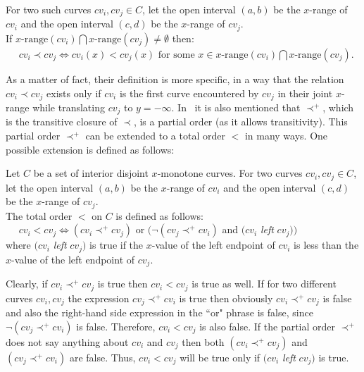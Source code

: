 \begin{definition}
For two such curves $cv_i, cv_j \in C$,
let the open interval $(a,b)$ be the $x$-range of $cv_i$
and the open interval $(c,d)$ be the $x$-range of $cv_j$.\\
If $x\text{-range}(cv_i) \bigcap x\text{-range}(cv_j) \neq\emptyset$ then:\\
\mbox{\ \ } $cv_i \prec cv_j \Leftrightarrow
 cv_i(x) < cv_j(x) \text{ for some } x \in x\text{-range}(cv_i) \bigcap x\text{-range}(cv_j)$.
\end{definition}

As a matter of fact, their definition is more specific,
in a way that the relation $cv_i \prec cv_j$ exists only
if $cv_i$ is the first curve encountered by $cv_j$
in their joint $x$-range
while translating $cv_j$ to $y=-\infty$.
In~\cite{GY-TSR-80} it is also mentioned that $\prec^+$, which is the transitive closure
of $\prec$, is a partial order (as it allows transitivity).
This partial order $\prec^+$ can be extended to a total order $<$ in many ways.
One possible extension is defined as follows:

\begin{definition}
\label{def:ord}
Let $C$ be a set of interior disjoint $x$-monotone curves.
For two curves $cv_i, cv_j \in C$,
let the open interval $(a,b)$ be the $x$-range of $cv_i$
and the open interval $(c,d)$ be the $x$-range of $cv_j$.\\
The total order $<$ on $C$ is defined as follows:\\
\mbox{\ \ } $cv_i < cv_j \Leftrightarrow (cv_i \prec^+ cv_j)$ or $(\neg(cv_j \prec^+ cv_i)$ and $(cv_i$ \emph{left} $cv_j))$ \\
where
$(cv_i$ \emph{left} $cv_j)$ is true if the $x$-value of the left endpoint of $cv_i$ is
less than the $x$-value of the left endpoint of $cv_j$.
\end{definition}

Clearly, if $cv_i \prec^+ cv_j$ is true then $cv_i < cv_j$ is true as well.
If for two different curves $cv_i, cv_j$ the expression $cv_j \prec^+ cv_i$
is true then obviously $cv_i \prec^+ cv_j$ is false
and also the right-hand side expression in the ``or" phrase is false, since~$\neg(cv_j \prec^+ cv_i)$ is false. Therefore, $cv_i < cv_j$ is also false.
If the partial order $\prec^+$ does not say anything about $cv_i$ and $cv_j$
then both $(cv_i \prec^+ cv_j)$ and~$(cv_j \prec^+ cv_i)$ are false.
Thus, $cv_i < cv_j$ will be true only if $(cv_i$ \emph{left} $cv_j)$ is true.

